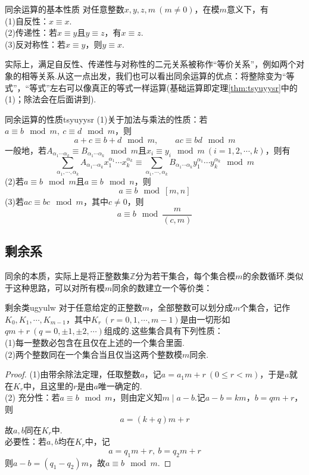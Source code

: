 \begin{theorem}{同余运算的基本性质}
	对任意整数$x,y,z,m~(m \neq 0)$，在模$m$意义下，有 \\
	(1)自反性：$x \equiv x$. \\
	(2)传递性：若$x \equiv y$且$y \equiv z$，有$x \equiv z$. \\
	(3)反对称性：若$x \equiv y$，则$y \equiv x$.
\end{theorem}
\begin{remark}
	实际上，满足自反性、传递性与对称性的二元关系被称作“等价关系”，例如两个对象的相等关系.从这一点出发，我们也可以看出同余运算的优点：将整除变为“等式”，“等式”左右可以像真正的等式一样运算(基础运算即定理\ref{thm:tsyuyysr}中的(1)；除法会在后面讲到).
\end{remark}

\begin{theorem}{同余运算的性质}{tsyuyysr}
	(1)关于加法与乘法的性质：若$a \equiv b \mod m,~c \equiv d \mod m$，则$$a+c \equiv b+d \mod m, \qquad ac \equiv bd \mod m$$
	一般地，若$A_{\alpha _1 \cdots \alpha _k} \equiv B_{\alpha _1 \cdots \alpha _k} \mod m$且$x_i \equiv y_i \mod m~(i=1,2,\cdots ,k)$，则有$$\sum_{\alpha _1, \cdots ,\alpha _k} A_{\alpha _1 \cdots \alpha _k} x_1^{\alpha _1} \cdots x_k^{\alpha _k} \equiv \sum_{\alpha _1, \cdots ,\alpha _k} B_{\alpha _1 \cdots \alpha _k} y_1^{\alpha _1} \cdots y_k^{\alpha _k} \mod m$$
	(2)若$a \equiv b \mod m$且$a \equiv b \mod n$，则$$a \equiv b \mod [m,n]$$
	(3)若$ac \equiv bc \mod m$，其中$c \neq 0$，则$$a \equiv b \mod \frac{m}{(c,m)}$$
\end{theorem}


\subsection{剩余系}

同余的本质，实际上是将正整数集$\mathbb{Z}$分为若干集合，每个集合模$m$的余数循环.类似于这种思路，可以对所有模$m$同余的数建立一个等价类：

\begin{theorem}{剩余类}{ugyulw}
	对于任意给定的正整数$m$，全部整数可以划分成$m$个集合，记作$K_0,K_1, \cdots ,K_{m-1}$，其中$K_r~(r=0,1,\cdots ,m-1)$是由一切形如$qm+r~(q=0,\pm 1,\pm 2,\cdots )$组成的.这些集合具有下列性质： \\
	(1)每一整数必包含在且仅在上述的一个集合里面. \\
	(2)两个整数同在一个集合当且仅当这两个整数模$m$同余.
\end{theorem}
\begin{proof}
	(1)由带余除法定理，任取整数$a$，记$a=a_1m + r~(0 \leq r < m)$，于是$a$就在$K_r$中，且这里的$r$是由$a$唯一确定的. \\
	(2) 充分性：若$a \equiv b \mod m$，则由定义知$m \mid a-b$.记$a-b = km$，$b=qm + r$，则$$a = (k+q)m +r$$
	故$a,b$同在$K_r$中. \\
	 必要性：若$a,b$均在$K_r$中，记$$a=q_1m+r,~b=q_2m+r$$
	则$a-b = (q_1-q_2)m$，故$a \equiv b \mod m$.
\end{proof}

